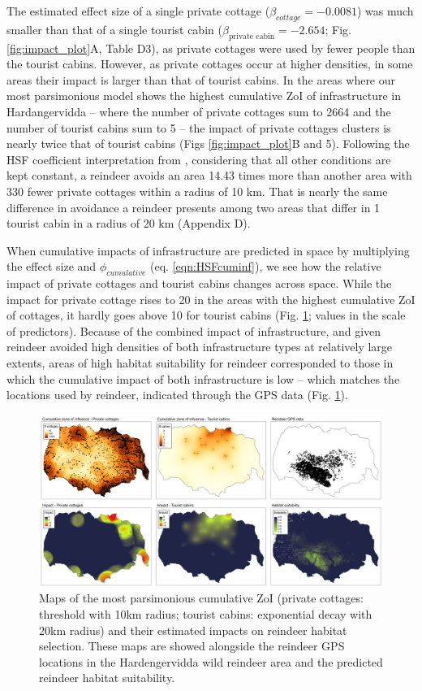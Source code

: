 \documentclass[titlepage]{article}
\begin{document}
The estimated effect size of a single private
cottage ($\beta_{cottage} = -0.0081$) was much smaller than that of a single tourist cabin
($\beta_{\text{private cabin}} = -2.654$; Fig. \ref{fig:impact_plot}A, Table D3), as
private cottages were used by fewer people than the tourist cabins. However, as
private cottages occur at higher densities, in some areas their impact 
is larger than that of tourist cabins. In the areas where our most parsimonious model shows the 
highest cumulative ZoI of infrastructure in Hardangervidda -- where the number of private cottages sum to 2664
and the number of tourist cabins sum to 5 -- the impact of 
private cottages clusters is nearly twice that of tourist cabins
(Figs \ref{fig:impact_plot}B and 5). Following the HSF coefficient interpretation from \citet{fieberg_how_2021}, considering that all other conditions are kept constant, a reindeer avoids an area 14.43 times more than another area with
330 fewer private cottages within a radius of 10 km. That is nearly the same difference in avoidance a reindeer presents among two areas that differ in 1 tourist cabin in a radius of 20 km (Appendix D).

When cumulative impacts of infrastructure are predicted in space by multiplying the effect size and $\phi_{cumulative}$ (eq. \ref{eqn:HSFcuminf}), we see how the relative impact of private cottages and tourist cabins changes across space. While the impact for private cottage rises to 20 in the areas with the highest cumulative ZoI of cottages, it hardly goes above 10 for tourist cabins (Fig. \ref{fig:prediction_maps}; values in the scale of predictors). Because of the combined impact of infrastructure, and given reindeer
avoided high densities of both infrastructure types at relatively large extents, 
areas of high habitat suitability for reindeer corresponded to those in which the
cumulative impact of both infrastructure is low -- which matches the
locations used by reindeer, indicated through the GPS data (Fig. \ref{fig:prediction_maps}).

\begin{figure}[h]
\centering
\includegraphics[width=1.3\textwidth,center]{figures/reindeer_results_prediction_maps.png}
\caption{\label{fig:prediction_maps} Maps of the most parsimonious cumulative ZoI (private cottages: threshold with 10km radius; tourist cabins: exponential decay with 20km radius) and their estimated impacts on reindeer habitat selection. These maps are showed alongside the reindeer GPS locations in the Hardengervidda wild reindeer area and the predicted reindeer habitat suitability.}
\end{figure}
\end{document}
